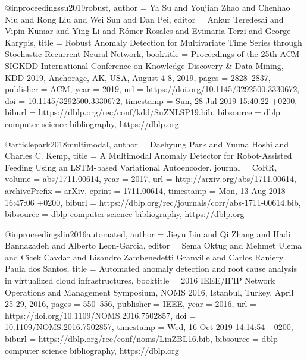 @inproceedings{su2019robust,
  author    = {Ya Su and
               Youjian Zhao and
               Chenhao Niu and
               Rong Liu and
               Wei Sun and
               Dan Pei},
  editor    = {Ankur Teredesai and
               Vipin Kumar and
               Ying Li and
               R{\'{o}}mer Rosales and
               Evimaria Terzi and
               George Karypis},
  title     = {Robust Anomaly Detection for Multivariate Time Series through Stochastic
               Recurrent Neural Network},
  booktitle = {Proceedings of the 25th {ACM} {SIGKDD} International Conference on
               Knowledge Discovery {\&} Data Mining, {KDD} 2019, Anchorage, AK,
               USA, August 4-8, 2019},
  pages     = {2828--2837},
  publisher = {{ACM}},
  year      = {2019},
  url       = {https://doi.org/10.1145/3292500.3330672},
  doi       = {10.1145/3292500.3330672},
  timestamp = {Sun, 28 Jul 2019 15:40:22 +0200},
  biburl    = {https://dblp.org/rec/conf/kdd/SuZNLSP19.bib},
  bibsource = {dblp computer science bibliography, https://dblp.org}
}

@article{park2018multimodal,
   author    = {Daehyung Park and
               Yuuna Hoshi and
               Charles C. Kemp},
  title     = {A Multimodal Anomaly Detector for Robot-Assisted Feeding Using an
               LSTM-based Variational Autoencoder},
  journal   = {CoRR},
  volume    = {abs/1711.00614},
  year      = {2017},
  url       = {http://arxiv.org/abs/1711.00614},
  archivePrefix = {arXiv},
  eprint    = {1711.00614},
  timestamp = {Mon, 13 Aug 2018 16:47:06 +0200},
  biburl    = {https://dblp.org/rec/journals/corr/abs-1711-00614.bib},
  bibsource = {dblp computer science bibliography, https://dblp.org}
}

@inproceedings{lin2016automated,
  author    = {Jieyu Lin and
               Qi Zhang and
               Hadi Bannazadeh and
               Alberto Leon{-}Garcia},
  editor    = {Sema Oktug and
               Mehmet Ulema and
               Cicek Cavdar and
               Lisandro Zambenedetti Granville and
               Carlos Raniery Paula dos Santos},
  title     = {Automated anomaly detection and root cause analysis in virtualized
               cloud infrastructures},
  booktitle = {2016 {IEEE/IFIP} Network Operations and Management Symposium, {NOMS}
               2016, Istanbul, Turkey, April 25-29, 2016},
  pages     = {550--556},
  publisher = {{IEEE}},
  year      = {2016},
  url       = {https://doi.org/10.1109/NOMS.2016.7502857},
  doi       = {10.1109/NOMS.2016.7502857},
  timestamp = {Wed, 16 Oct 2019 14:14:54 +0200},
  biburl    = {https://dblp.org/rec/conf/noms/LinZBL16.bib},
  bibsource = {dblp computer science bibliography, https://dblp.org}
}


